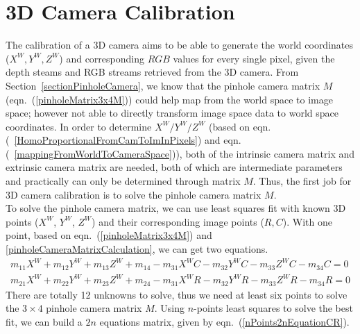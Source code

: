    
\section{3D Camera Calibration}
\label{section3DcameraCalibration}
\indent
The calibration of a 3D camera aims to be able to generate the world coordinates (\(X^W, Y^W, Z^W\)) and corresponding \(RGB\) values for every single pixel, given the depth steams and RGB streams retrieved from the 3D camera. From Section~\ref{sectionPinholeCamera}, we know that the pinhole camera matrix \(M\) (eqn.~(\ref{pinholeMatrix3x4M})) could help map from the world space to image space; however not able to directly transform image space data to world space coordinates. In order to determine \(X^W/Y^W/Z^W\) (based on eqn.(~\ref{HomoProportionalFromCamToImInPixels}) and eqn.(~\ref{mappingFromWorldToCameraSpace})), both of the intrinsic camera matrix and extrinsic camera matrix are needed, both of which are intermediate parameters and practically can only be determined through matrix \(M\). Thus, the first job for 3D camera calibration is to solve the pinhole camera matrix \(M\).
\\\indent
To solve the pinhole camera matrix, we can use least squares fit with known 3D points (\(X^W\), \(Y^W\), \(Z^W\)) and their corresponding image points (\(R, C\)). With one point, based on eqn.~(\ref{pinholeMatrix3x4M}) and \ref{pinholeCameraMatrixCalculation}, we can get two equations.
\begin{equation}
\begin{aligned}
m_{11}X^W + m_{12}Y^W + m_{13}Z^W + m_{14} - m_{31}X^WC - m_{32}Y^WC - m_{33}Z^WC - m_{34}C = 0%
\\%
m_{21}X^W + m_{22}Y^W + m_{23}Z^W + m_{24} - m_{31}X^WR - m_{32}Y^WR - m_{33}Z^WR - m_{34}R = 0
\end{aligned}
\label{onePointEquationCR}
\end{equation}%
\noindent
There are totally 12 unknowns to solve, thus we need at least six points to solve the $3\times4$ pinhole camera matrix \(M\). Using $n$-points least squares to solve the best fit, we can build a $2n$ equations matrix, given by eqn.~(\ref{nPoints2nEquationCR}).

